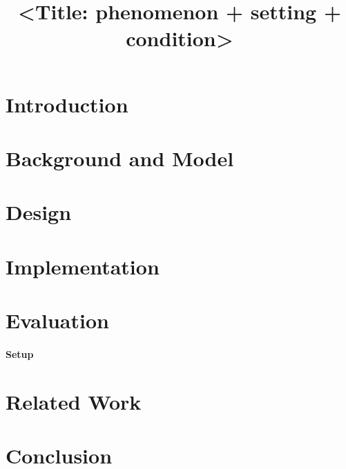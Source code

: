 \documentclass[conference]{IEEEtran}
\begin{document}
\title{<Title: phenomenon + setting + condition>}

\author{
}

\maketitle

\begin{abstract}
\end{abstract}

\section{Introduction}

\section{Background and Model}

\section{Design}

\section{Implementation}

\section{Evaluation}
\paragraph{Setup}

\section{Related Work}

\section{Conclusion}

\clearpage


\end{document}
